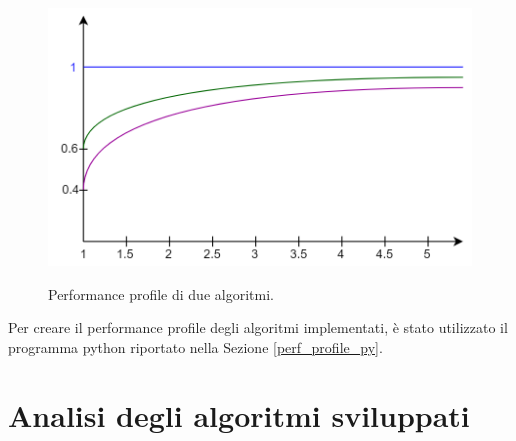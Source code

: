 \begin{figure}[h] 
\begin{center} 
  \includegraphics[scale=0.4]{Images/perf_profile}\\ 
  \caption{\footnotesize{Performance profile di due algoritmi.}}
  \label{perf_profile} 
\end{center} 
\end{figure}

Per creare il performance profile degli algoritmi implementati, è stato utilizzato il programma python riportato nella Sezione \ref{perf_profile_py}. 

\section{Analisi degli algoritmi sviluppati}
